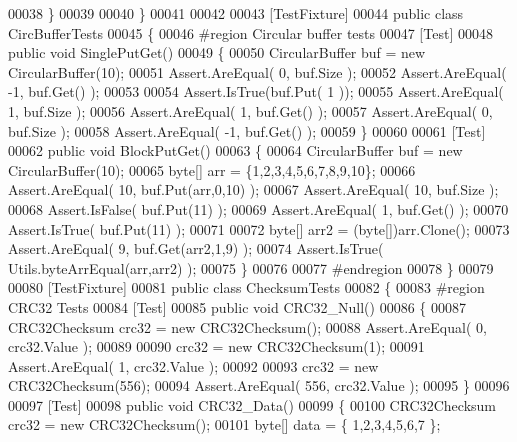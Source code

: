 \begin{DoxyCode}
00038         \}
00039 
00040     \}
00041 
00042 
00043     [TestFixture]
00044     \textcolor{keyword}{public} \textcolor{keyword}{class }CircBufferTests
00045     \{
00046 \textcolor{preprocessor}{        #region Circular buffer tests}
00047         [Test]
00048         \textcolor{keyword}{public} \textcolor{keywordtype}{void} SinglePutGet()
00049         \{
00050             CircularBuffer buf = \textcolor{keyword}{new} CircularBuffer(10);
00051             Assert.AreEqual( 0, buf.Size );
00052             Assert.AreEqual( -1, buf.Get() );
00053 
00054             Assert.IsTrue(buf.Put( 1 ));
00055             Assert.AreEqual( 1, buf.Size );
00056             Assert.AreEqual( 1, buf.Get() );
00057             Assert.AreEqual( 0, buf.Size );
00058             Assert.AreEqual( -1, buf.Get() );
00059         \}
00060 
00061         [Test]
00062         \textcolor{keyword}{public} \textcolor{keywordtype}{void} BlockPutGet()
00063         \{
00064             CircularBuffer buf = \textcolor{keyword}{new} CircularBuffer(10);
00065             byte[] arr = \{1,2,3,4,5,6,7,8,9,10\};
00066             Assert.AreEqual( 10, buf.Put(arr,0,10) );
00067             Assert.AreEqual( 10, buf.Size );
00068             Assert.IsFalse( buf.Put(11) );
00069             Assert.AreEqual( 1, buf.Get() );
00070             Assert.IsTrue( buf.Put(11) );
00071 
00072             byte[] arr2 = (byte[])arr.Clone();
00073             Assert.AreEqual( 9, buf.Get(arr2,1,9) );
00074             Assert.IsTrue( Utils.byteArrEqual(arr,arr2) );
00075         \}
00076 
00077 \textcolor{preprocessor}{        #endregion}
00078     \}
00079 
00080     [TestFixture]
00081     \textcolor{keyword}{public} \textcolor{keyword}{class }ChecksumTests
00082     \{
00083 \textcolor{preprocessor}{        #region CRC32 Tests}
00084         [Test]
00085         \textcolor{keyword}{public} \textcolor{keywordtype}{void} CRC32\_Null()
00086         \{
00087             CRC32Checksum crc32 = \textcolor{keyword}{new} CRC32Checksum();
00088             Assert.AreEqual( 0, crc32.Value );
00089 
00090             crc32 = \textcolor{keyword}{new} CRC32Checksum(1);
00091             Assert.AreEqual( 1, crc32.Value );
00092 
00093             crc32 = \textcolor{keyword}{new} CRC32Checksum(556);
00094             Assert.AreEqual( 556, crc32.Value );
00095         \}
00096 
00097         [Test]
00098         \textcolor{keyword}{public} \textcolor{keywordtype}{void} CRC32\_Data()
00099         \{
00100             CRC32Checksum crc32 = \textcolor{keyword}{new} CRC32Checksum();
00101             byte[] data = \{ 1,2,3,4,5,6,7 \};

\end{DoxyCode}
